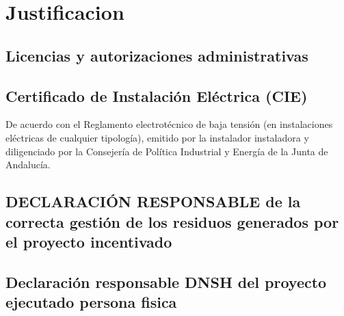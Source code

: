 \documentclass{article}
\begin{document}
\section{Justificacion}

\subsection{Licencias y autorizaciones administrativas}




\subsection{Certificado de Instalación Eléctrica (CIE)}
De acuerdo con el Reglamento electrotécnico de baja tensión (en  instalaciones eléctricas de cualquier tipología), 
emitido por la instalador instaladora y diligenciado por la 
Consejería de Política Industrial y  Energía de la Junta de Andalucía.


\subsection{DECLARACIÓN RESPONSABLE de la correcta gestión de los residuos generados por el proyecto incentivado}


\subsection{Declaración responsable DNSH del proyecto ejecutado persona fisica}

\end{document}
